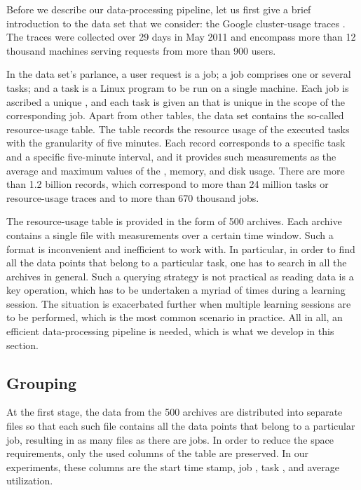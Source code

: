 Before we describe our data-processing pipeline, let us first give a brief
introduction to the data set that we consider: the Google cluster-usage traces
\cite{reiss2011}. The traces were collected over 29 days in May 2011 and
encompass more than 12 thousand machines serving requests from more than 900
users.

In the data set's parlance, a user request is a job; a job comprises one or
several tasks; and a task is a Linux program to be run on a single machine.
Each job is ascribed a unique , and each task is given an  that is
unique in the scope of the corresponding job. Apart from other tables, the data
set contains the so-called resource-usage table. The table records the resource
usage of the executed tasks with the granularity of five minutes. Each record
corresponds to a specific task and a specific five-minute interval, and it
provides such measurements as the average and maximum values of the ,
memory, and disk usage. There are more than 1.2 billion records, which
correspond to more than 24 million tasks or resource-usage traces and to more
than 670 thousand jobs.

The resource-usage table is provided in the form of 500 archives. Each archive
contains a single  file with measurements over a certain time window.
Such a format is inconvenient and inefficient to work with. In particular, in
order to find all the data points that belong to a particular task, one has to
search in all the archives in general. Such a querying strategy is not practical
as reading data is a key operation, which has to be undertaken a myriad of times
during a learning session. The situation is exacerbated further when multiple
learning sessions are to be performed, which is the most common scenario in
practice. All in all, an efficient data-processing pipeline is needed, which is
what we develop in this section.

\subsection{Grouping} 
At the first stage, the  data from the 500 archives are distributed into
separate  files so that each such file contains all the data points that
belong to a particular job, resulting in as many  files as there are
jobs. In order to reduce the space requirements, only the used columns of the
table are preserved. In our experiments, these columns are the start time stamp,
job , task , and average  utilization.

